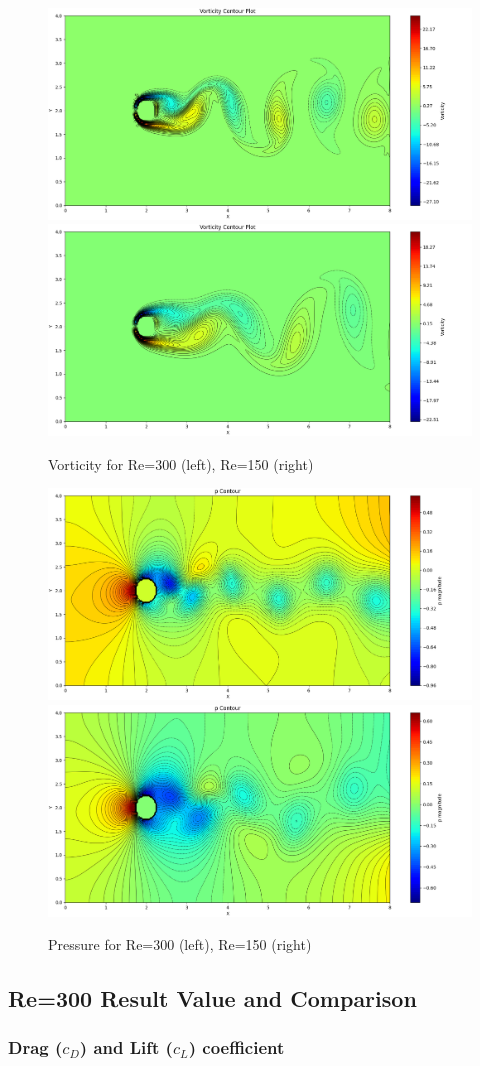 \documentclass[12pt]{article}
\begin{document}
\begin{figure}[H]
    \centering
    \includegraphics[width=0.45\linewidth]{figure/N32_Re300_8x4_t100/vor_N32_Re300_8x4_t100.jpg}
    \includegraphics[width=0.45\linewidth]{figure/N32_Re150_8x4_t100/vor_N32_Re150_8x4_t100.jpg}
    \caption{Vorticity for Re=300 (left), Re=150 (right) }
\end{figure}

\begin{figure}[H]
    \centering
    \includegraphics[width=0.45\linewidth]{figure/N32_Re300_8x4_t100/p_N32_Re300_8x4_t100.jpg}
    \includegraphics[width=0.45\linewidth]{figure/N32_Re150_8x4_t100/p_N32_Re150_8x4_t100.jpg}
    \caption{Pressure for Re=300 (left), Re=150 (right)}
\end{figure}



\subsection{Re=300 Result Value and Comparison}

\subsubsection{Drag ($c_D$) and Lift ($c_L$) coefficient}
\end{document}

